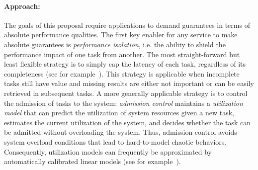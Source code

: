 

\paragraph{Approach:} The goals of this proposal require applications
to demand guarantees in terms of absolute performance qualities.
The first key enabler for any service to make absolute guarantees
is \emph{performance isolation}, i.e. the ability to shield the
performance impact of one task from another. The most straight-forward
but least flexible strategy is to simply cap the latency of each
task, regardless of its completeness (see for
example~\cite{decandia:sosp07}). This strategy is applicable when
incomplete tasks still have value and missing results are either
not important or can be easily retrieved in subsequent tasks. A
more generally applicable strategy is to control the admission of
tasks to the system: \emph{admission control} maintains a
\emph{utilization model} that can predict the utilization of system
resources given a new task, estimates the current utilization of
the system, and decides whether the task can be admitted without
overloading the system. Thus, admission control avoids system
overload conditions that lead to hard-to-model chaotic behaviors.
Consequently, utilization models can frequently be approximated by
automatically calibrated linear models (see for
example~\cite{skourtis:hpdc12}).

